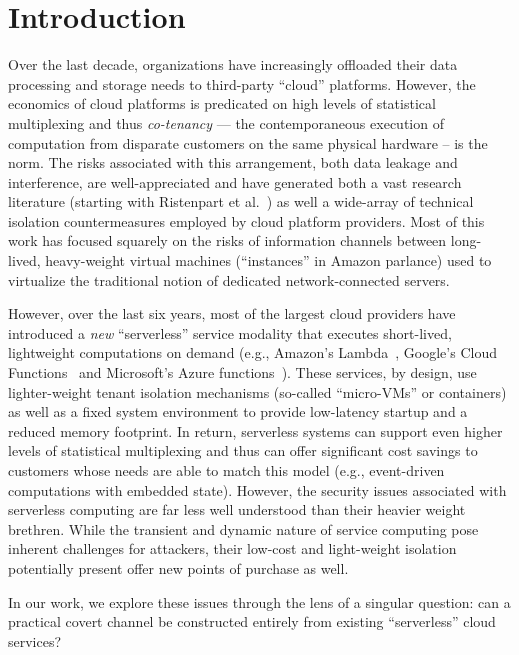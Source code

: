 \section{Introduction}
\label{sec:intro}

Over the last decade, organizations have increasingly offloaded their
data processing and storage needs to third-party ``cloud'' platforms.
However, the economics of cloud platforms is predicated on high levels
of statistical multiplexing and thus \emph{co-tenancy} --- the
contemporaneous execution of computation from disparate customers on
the same physical hardware -- is the norm.  The risks associated with
this arrangement, both data leakage and interference, are
well-appreciated and have generated both a vast research literature
(starting with Ristenpart et al.~\cite{ristenpartccs2009}) as well a
wide-array of technical isolation countermeasures employed by cloud
platform providers. Most of this work has focused squarely on the risks
of information channels between long-lived, heavy-weight virtual
machines (``instances'' in Amazon parlance) used to virtualize the
traditional notion of dedicated network-connected servers.

However, over the last six years, most of the largest cloud providers have
introduced a \emph{new} ``serverless'' service modality that executes
short-lived, lightweight computations on demand (e.g., Amazon's
Lambda~\cite{awslambda}, Google's Cloud Functions~\cite{gcpfunctions} and
Microsoft's Azure functions~\cite{azurefunctions}).  These services, by design,
use lighter-weight tenant isolation mechanisms (so-called ``micro-VMs'' or
containers) as well as a fixed system environment to provide low-latency startup
and a reduced memory footprint.  In return, serverless systems can support even
higher levels of statistical multiplexing and thus can offer significant cost
savings to customers whose needs are able to match this model (e.g.,
event-driven computations with embedded state).  However, the security issues
associated with serverless computing are far less well understood than their
heavier weight brethren.  While the transient and dynamic nature of service
computing pose inherent challenges for attackers, their low-cost and
light-weight isolation potentially present offer new points of purchase as well.

In our work, we explore these issues through the lens of a singular question:
can a practical covert channel be constructed entirely from existing
``serverless'' cloud services?


